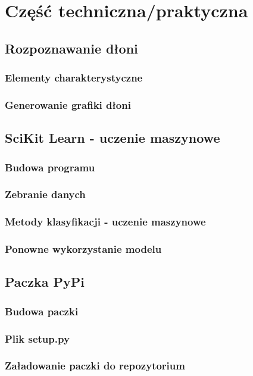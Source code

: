 \chapter{Część techniczna/praktyczna}
\section{Rozpoznawanie dłoni}
\subsection{Elementy charakterystyczne}
\subsection{Generowanie grafiki dłoni}

\section{SciKit Learn - uczenie maszynowe}
\subsection{Budowa programu}
\subsection{Zebranie danych}
\subsection{Metody klasyfikacji - uczenie maszynowe}
\subsection{Ponowne wykorzystanie modelu}

\section{Paczka PyPi}
\subsection{Budowa paczki}
\subsection{Plik setup.py}
\subsection{Załadowanie paczki do repozytorium}
